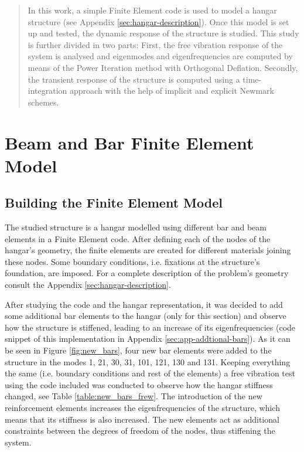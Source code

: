\documentclass[AMdocument,optEnglish]{AMlatex}  %
\begin{document}
	
%  

\begin{abstract}
	In this work, a simple Finite Element code is used to model a hangar structure (see Appendix \ref{sec:hangar-description}). Once this model is set up and tested, the dynamic response of the structure is studied. This study is further divided in two parts: First, the free vibration response of the system is analysed and eigenmodes and eigenfrequencies are computed by means of the Power Iteration method with Orthogonal Deflation. Secondly, the transient response of the structure is computed using a time-integration approach with the help of implicit and explicit Newmark schemes.
\end{abstract}

\tableofcontents

\section{Beam and Bar Finite Element Model}
\label{sec:model}

\subsection{Building the Finite Element Model}

The studied structure is a hangar modelled using different bar and beam elements in a Finite Element code. After defining each of the nodes of the hangar's geometry, the finite elements are created for different materials joining these nodes. Some boundary conditions, i.e. fixations at the structure's foundation, are imposed. For a complete description of the problem's geometry consult the Appendix \ref{sec:hangar-description}.

After studying the code and the hangar representation, it was decided to add some additional bar elements to the hangar (only for this section) and observe how the structure is stiffened, leading to an increase of its eigenfrequencies (code snippet of this implementation in Appendix \ref{sec:app-addtional-bars}). As it can be seen in Figure \ref{fig:new_bars}, four new bar elements were added to the structure in the modes 1, 21, 30, 31, 101, 121, 130 and 131. Keeping everything the same (i.e. boundary conditions and rest of the elements) a free vibration test using the code included was conducted to observe how the hangar stiffness changed, see Table \ref{table:new_bars_frew}. The introduction of the new reinforcement elements increases the eigenfrequencies of the structure, which means that its stiffness is also increased. The new elements act as additional constraints between the degrees of freedom of the nodes, thus stiffening the system.
\end{document}
